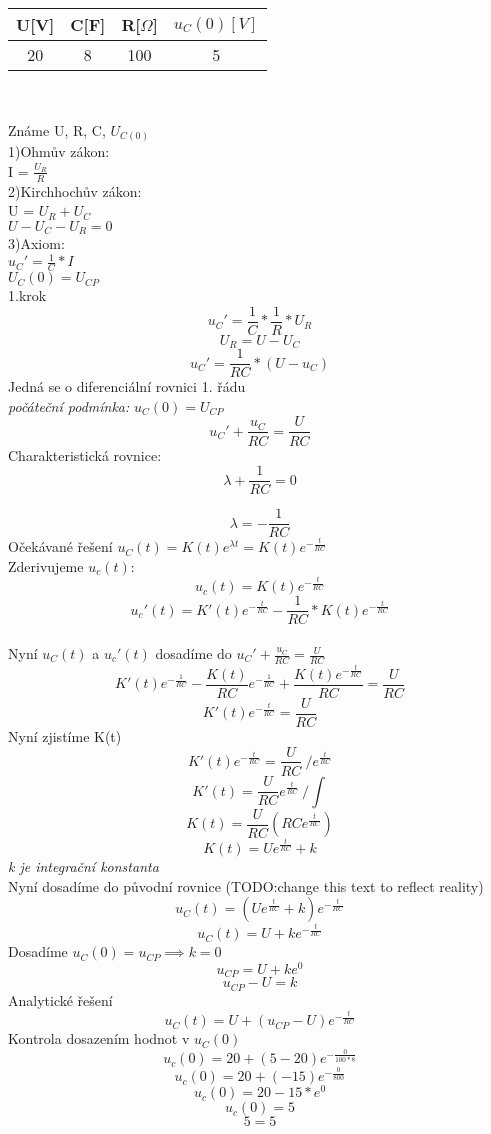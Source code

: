 \documentclass[12pt]{article}
\begin{document}
\begin{center}
\begin{tabular}{| c | c | c | c |}
\hline
U[V] & C[F] & R[$\Omega$] & $u_{C}(0)[V]$ \\
\hline
20 & 8 & 100 & 5\\
\hline
\end{tabular}\\
\end{center}
Známe U, R, C, $U_{C(0)}$\\
1)Ohmův zákon:\\ I = $\frac{U_{R}}{R}$\\
2)Kirchhochův zákon:\\ U = $U_{R}+U_{C}$\\ $U-U_{C}-U_{R}=0$\\
3)Axiom:\\$u_{C}'=\frac{1}{C}*I$\\ $U_{C}(0)=U_{CP}$\\
1.krok\\
\[
  u_{C}'=\displaystyle\frac{1}{C}*\displaystyle\frac{1}{R}*U_{R}
\]
\[
  U_{R} = U-U_{C}
\]
\[
  u_{C}'=\displaystyle\frac{1}{RC}*(U-u_{C})
\]
Jedná se o diferenciální rovnici 1. řádu\\
\textit{počáteční podmínka:} $u_{C}(0)=U_{CP}$\\
\[
  u_{C}'+\displaystyle\frac{u_{C}}{RC}= \displaystyle\frac{U}{RC}
\]
Charakteristická rovnice:
\[
  \lambda + \displaystyle\frac{1}{RC}=0
\]

\[
  \lambda =-\displaystyle\frac{1}{RC}
\]
Očekávané řešení $u_{C}(t)=K(t)e^{\lambda t} = K(t)e^{-\frac{t}{RC}}$\\
Zderivujeme $u_{c}(t)$:
\[
  u_{c}(t) = K(t)e^{-\frac{t}{RC}}
\]
\[
  u_{c}'(t)=K'(t)e^{-\frac{t}{RC}}- \displaystyle\frac{1}{RC}*K(t)e^{-\frac{t}{RC}}
\]\\
Nyní $u_{C}(t)$ a $u_{c}'(t)$ dosadíme do $u_{C}'+\frac{u_{C}}{RC}=\frac{U}{RC}$
\[
  K'(t)e^{-\frac{1}{RC}}-\displaystyle\frac{K(t)}{RC}e^{-\frac{1}{RC}}+\displaystyle\frac{K(t)e^{-\frac{t}{RC}}}{RC}=\displaystyle\frac{U}{RC}
\]
\[
  K'(t)e^{-\frac{t}{RC}}=\displaystyle\frac{U}{RC}
\]
Nyní zjistíme K(t)
\[
  K'(t)e^{-\frac{t}{RC}}=\displaystyle\frac{U}{RC}\ /e^{\frac{t}{RC}}
\]
\[
  K'(t)=\displaystyle\frac{U}{RC}e^{\frac{t}{RC}}\ /\int{}{}
\]
\[
  K(t)=\displaystyle\frac{U}{RC}(RCe^{\frac{t}{RC}})
\]
\[
  K(t)=Ue^{\frac{t}{RC}}+k
\]
\textit{k je integrační konstanta}\\

Nyní dosadíme do původní rovnice (TODO:change this text to reflect reality)
\[
  u_{C}(t) = (Ue^{\frac{t}{RC}}+k)e^{-\frac{t}{RC}}
\]
\[
  u_{C}(t)=U+ke^{-\frac{t}{RC}}
\]
Dosadíme $u_{C}(0)=u_{CP}\implies k=0$
\[
  u_{CP}=U+ke^{0}
\]
\[
  u_{CP}-U=k
\]
Analytické řešení
\[
  u_{C}(t) = U + (u_{CP}-U)e^{-\frac{t}{RC}}
\]
Kontrola dosazením hodnot v $u_{C}(0)$
\[
  u_{c}(0) = 20 + (5-20)e^{-\frac{0}{100*8}}
\]
\[
  u_{c}(0) = 20 + (-15)e^{-\frac{0}{800}}
\]
\[
  u_{c}(0) = 20 -15*e^{0}
\]
\[
  u_{c}(0) = 5 
\]
\[
  5=5
\]
\end{document}
